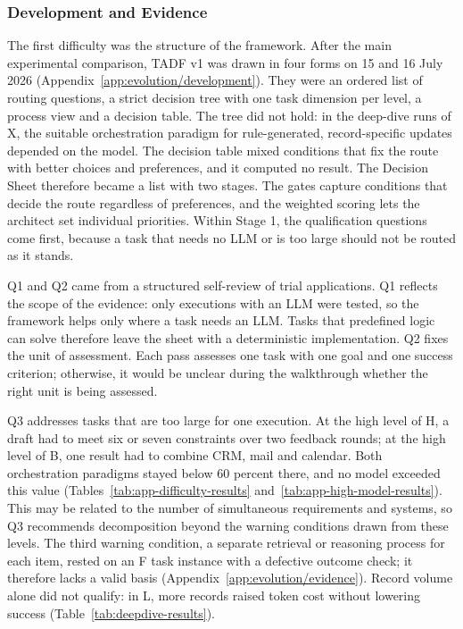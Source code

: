 \subsubsection{Development and Evidence}
\label{subsubsec:TADF/evolution}
\label{subsubsec:TADF/evidence}
The first difficulty was the structure of the framework. After the main experimental comparison, TADF v1 was drawn in four forms on 15 and 16 July 2026 (Appendix~\ref{app:evolution/development}). They were an ordered list of routing questions, a strict decision tree with one task dimension per level, a process view and a decision table. The tree did not hold: in the deep-dive runs of X, the suitable orchestration paradigm for rule-generated, record-specific updates depended on the model. The decision table mixed conditions that fix the route with better choices and preferences, and it computed no result. The Decision Sheet therefore became a list with two stages. The gates capture conditions that decide the route regardless of preferences, and the weighted scoring lets the architect set individual priorities. Within Stage 1, the qualification questions come first, because a task that needs no LLM or is too large should not be routed as it stands.

Q1 and Q2 came from a structured self-review of trial applications. Q1 reflects the scope of the evidence: only executions with an LLM were tested, so the framework helps only where a task needs an LLM. Tasks that predefined logic can solve therefore leave the sheet with a deterministic implementation. Q2 fixes the unit of assessment. Each pass assesses one task with one goal and one success criterion; otherwise, it would be unclear during the walkthrough whether the right unit is being assessed.

Q3 addresses tasks that are too large for one execution. At the high level of H, a draft had to meet six or seven constraints over two feedback rounds; at the high level of B, one result had to combine CRM, mail and calendar. Both orchestration paradigms stayed below 60 percent there, and no model exceeded this value (Tables~\ref{tab:app-difficulty-results} and~\ref{tab:app-high-model-results}). This may be related to the number of simultaneous requirements and systems, so Q3 recommends decomposition beyond the warning conditions drawn from these levels. The third warning condition, a separate retrieval or reasoning process for each item, rested on an F task instance with a defective outcome check; it therefore lacks a valid basis (Appendix~\ref{app:evolution/evidence}). Record volume alone did not qualify: in L, more records raised token cost without lowering success (Table~\ref{tab:deepdive-results}).

